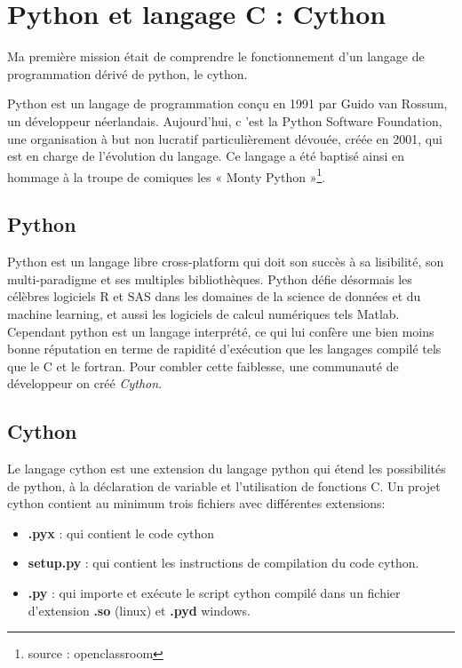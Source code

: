 \chapter{Python et langage C : Cython} 

Ma première mission était de comprendre le fonctionnement d'un langage de programmation dérivé de python, le cython.

Python est un langage de programmation conçu en 1991 par Guido van Rossum, un développeur néerlandais. Aujourd'hui, c 'est la Python Software Foundation, une organisation à but non lucratif particulièrement dévouée, créée en 2001, qui est en charge de l'évolution du langage. Ce langage a été baptisé ainsi en hommage à la troupe de comiques les « Monty Python »\footnote{source : openclassroom}.

\section{Python}

Python est un langage libre cross-platform qui doit son succès à sa lisibilité, son multi-paradigme et ses multiples bibliothèques. Python défie désormais les célèbres logiciels R et SAS dans les domaines de la science de données et du machine learning, et aussi les logiciels de calcul numériques tels Matlab. Cependant python est un langage interprété, ce qui lui confère une bien moins bonne réputation en terme de rapidité d'exécution que les langages compilé tels que le C et le fortran. Pour combler cette faiblesse, une communauté de développeur on créé \emph{Cython}.

\section{Cython}

Le langage cython est une extension du langage python qui étend les possibilités de python, à la déclaration de variable et l'utilisation de fonctions C. 
Un projet cython contient au minimum trois fichiers avec différentes extensions:
\begin{itemize}
\item  \textbf{.pyx} : qui contient le code cython
\item  \textbf{setup.py} : qui contient les instructions de compilation du code cython.
\item \textbf{.py} :  qui importe et exécute le script cython compilé dans un fichier d'extension \textbf{.so} (linux) et \textbf{.pyd} windows.
\end{itemize}

